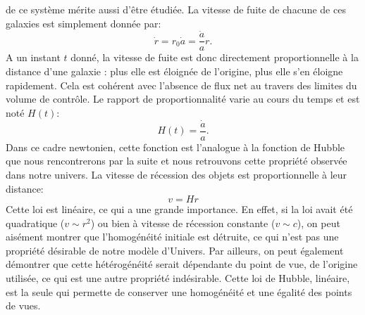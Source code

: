  de ce système mérite aussi d'être étudiée. La vitesse de fuite de chacune de ces galaxies est simplement donnée par:
\begin{equation}
\dot r= r_0 \dot a = \frac{\dot a}{a} r.
\end{equation}
A un instant $t$ donné, la vitesse de fuite est donc directement proportionnelle à la distance d'une galaxie : plus elle est éloignée de l'origine, plus elle s'en éloigne rapidement. Cela est cohérent avec l'absence de flux net au travers des limites du volume de contrôle. Le rapport de proportionnalité varie au cours du temps et est noté $H(t)$:
\begin{equation}
H(t)=\frac{\dot a}{a}.
\end{equation}
Dans ce cadre newtonien, cette fonction est l'analogue à la fonction de Hubble  que nous rencontrerons par la suite et nous retrouvons cette propriété observée dans notre univers. La vitesse de récession des objets est proportionnelle à leur distance:
\begin{equation}
v=Hr
\label{e:hubblenewt}
\end{equation}
Cette loi est linéaire, ce qui a une grande importance. En effet, si la loi avait été quadratique ($v\sim r^2$) ou bien à vitesse de récession constante ($v\sim c$), on peut aisément montrer que l'homogénéité initiale est détruite, ce qui n'est pas une propriété désirable de notre modèle d'Univers. Par ailleurs, on peut également démontrer que cette hétérogénéité serait dépendante du point de vue, de l'origine utilisée, ce qui est une autre propriété indésirable. Cette loi de Hubble, linéaire, est la seule qui permette de conserver une homogénéité et une égalité des points de vues.

